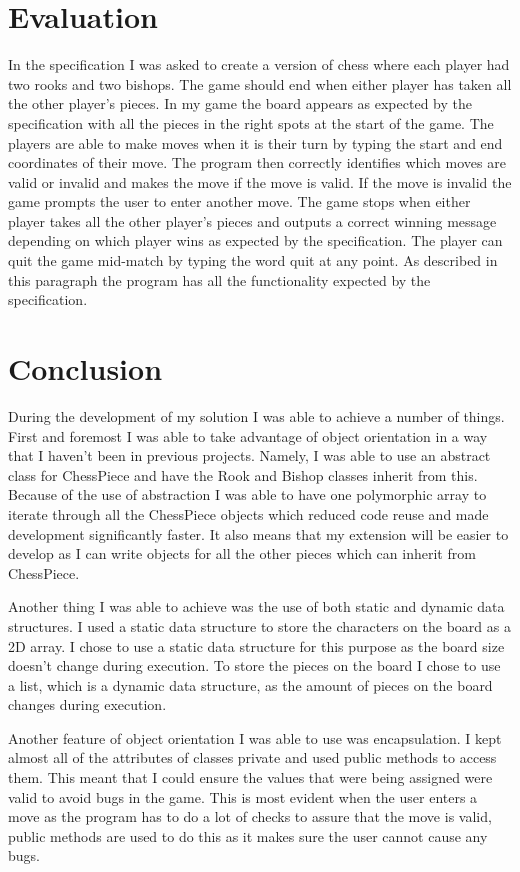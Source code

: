 \documentclass[a4paper]{article}
\begin{document}
\section*{Evaluation}
In the specification I was asked to create a version of chess where each player had two rooks and two bishops. The game should end when either player has taken all the other player's pieces. In my game the board appears as expected by the specification with all the pieces in the right spots at the start of the game. The players are able to make moves when it is their turn by typing the start and end coordinates of their move. The program then correctly identifies which moves are valid or invalid and makes the move if the move is valid. If the move is invalid the game prompts the user to enter another move. The game stops when either player takes all the other player's pieces and outputs a correct winning message depending on which player wins as expected by the specification. The player can quit the game mid-match by typing the word quit at any point. As described in this paragraph the program has all the functionality expected by the specification.

\section*{Conclusion}
During the development of my solution I was able to achieve a number of things. First and foremost I was able to take advantage of object orientation in a way that I haven't been in previous projects. Namely, I was able to use an abstract class for ChessPiece and have the Rook and Bishop classes inherit from this. Because of the use of abstraction I was able to have one polymorphic array to iterate through all the ChessPiece objects which reduced code reuse and made development significantly faster. It also means that my extension will be easier to develop as I can write objects for all the other pieces which can inherit from ChessPiece.

Another thing I was able to achieve was the use of both static and dynamic data structures. I used a static data structure to store the characters on the board as a 2D array. I chose to use a static data structure for this purpose as the board size doesn't change during execution. To store the pieces on the board I chose to use a list, which is a dynamic data structure, as the amount of pieces on the board changes during execution.

Another feature of object orientation I was able to use was encapsulation. I kept almost all of the attributes of classes private and used public methods to access them. This meant that I could ensure the values that were being assigned were valid to avoid bugs in the game. This is most evident when the user enters a move as the program has to do a lot of checks to assure that the move is valid, public methods are used to do this as it makes sure the user cannot cause any bugs.
\end{document}
